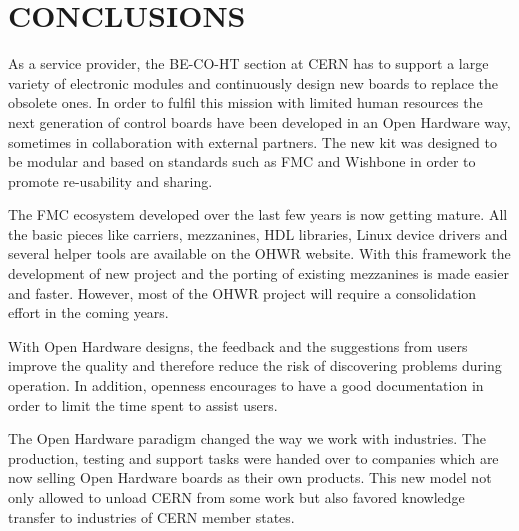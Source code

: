 \documentclass{JAC2003}
\begin{document}
\section{CONCLUSIONS}
As a service provider, the BE-CO-HT section at CERN has to support a large variety of electronic modules and continuously design new boards to replace the obsolete ones.
In order to fulfil this mission with limited human resources the next generation of control boards have been developed in an Open Hardware way, sometimes in collaboration with external partners.
The new kit was designed to be modular and based on standards such as FMC and Wishbone in order to promote re-usability and sharing.

The FMC ecosystem developed over the last few years is now getting mature.
All the basic pieces like carriers, mezzanines, HDL libraries, Linux device drivers and several helper tools are available on the OHWR website.
With this framework the development of new project and the porting of existing mezzanines is made easier and faster.
However, most of the OHWR project will require a consolidation effort in the coming years.

With Open Hardware designs, the feedback and the suggestions from users improve the quality and therefore reduce the risk of discovering problems during operation.
In addition, openness encourages to have a good documentation in order to limit the time spent to assist users.

The Open Hardware paradigm changed the way we work with industries. The production, testing and support tasks were handed over to companies which are now selling Open Hardware boards as their own products.
This new model not only allowed to unload CERN from some work but also favored knowledge transfer to industries of CERN member states.
\end{document}
